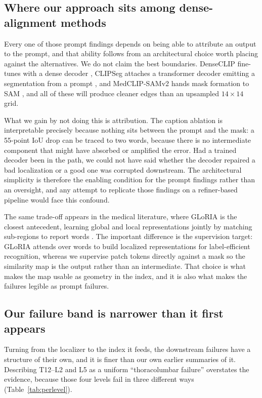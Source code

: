 \subsection{Where our approach sits among dense-alignment methods}

Every one of those prompt findings depends on being able to attribute an output
to the prompt, and that ability follows from an architectural choice worth
placing against the alternatives. We do not claim the best boundaries. DenseCLIP
fine-tunes with a dense decoder \cite{rao2022denseclip}, CLIPSeg attaches a
transformer decoder emitting a segmentation from a prompt
\cite{lueddecke2022clipseg}, and MedCLIP-SAMv2 hands mask formation to SAM
\cite{koleilat2025medclipsamv2, kirillov2023sam}, and all of these will produce
cleaner edges than an upsampled $14\times14$ grid.

What we gain by not doing this is attribution. The caption ablation is
interpretable precisely because nothing sits between the prompt and the mask: a
55-point IoU drop can be traced to two words, because there is no intermediate
component that might have absorbed or amplified the error. Had a trained decoder
been in the path, we could not have said whether the decoder repaired a bad
localization or a good one was corrupted downstream. The architectural
simplicity is therefore the enabling condition for the prompt findings rather
than an oversight, and any attempt to replicate those findings on a
refiner-based pipeline would face this confound.

The same trade-off appears in the medical literature, where GLoRIA is the
closest antecedent, learning global and local representations jointly by
matching sub-regions to report words \cite{huang2021gloria}. The important
difference is the supervision target: GLoRIA attends over words to build
localized representations for label-efficient recognition, whereas we supervise
patch tokens directly against a mask so the similarity map is the output rather
than an intermediate. That choice is what makes the map usable as geometry in
the index, and it is also what makes the failures legible as prompt failures.

\subsection{Our failure band is narrower than it first appears}

Turning from the localizer to the index it feeds, the downstream failures have a
structure of their own, and it is finer than our own earlier summaries of it.
Describing T12--L2 and L5 as a uniform ``thoracolumbar failure'' overstates the
evidence, because those four levels fail in three different ways
(Table~\ref{tab:perlevel}).

